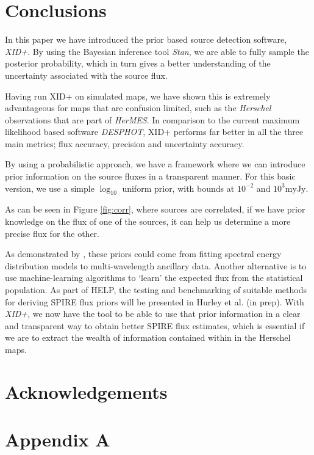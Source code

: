 \documentclass[useAMS,usenatbib]{mnras}
\begin{document}
\section{Conclusions}\label{sec:conc}
In this paper we have introduced the prior based source detection software, \emph{XID+}. By using the Bayesian inference tool \emph{Stan}, we are able to fully sample the posterior probability, which in turn gives a better understanding of the uncertainty associated with the source flux. 

Having run XID+ on simulated maps, we have shown this is extremely advantageous for maps that are confusion limited, such as the \emph{Herschel} observations that are part of \emph{HerMES}. In comparison to the current maximum likelihood based software \emph{DESPHOT}, XID+ performs far better in all the three main metrics; flux accuracy, precision and uncertainty accuracy. 
 
By using a probabilistic approach, we have a framework where we can introduce prior information on the source fluxes in a transparent manner. For this basic version, we use a simple $\log_{10}$ uniform prior, with bounds at $10^{-2}$ and $10^{3}\mathrm{myJy}$. 

As can be seen in Figure \ref{fig:corr}, where sources are correlated, if we have prior knowledge on the flux of one of the sources, it can help us determine a more precise flux for the other.

As demonstrated by \cite{Safarzadeh:2015}, these priors could come from fitting spectral energy distribution models to multi-wavelength ancillary data. Another alternative is to use machine-learning algorithms to `learn' the expected flux from the statistical population. As part of HELP, the testing and benchmarking of suitable methods for deriving SPIRE flux priors will be presented in Hurley et al. (in prep). With \emph{XID+}, we now have the tool to be able to use that prior information in a clear and transparent way to obtain better SPIRE flux estimates, which is essential if we are to extract the wealth of information contained within in the Herschel maps.

\section*{Acknowledgements}%
%
%
%

\appendix
\section*{Appendix A}\label{Stan_model}
\onecolumn

%
%
%
%
%
%
%
\end{document}
